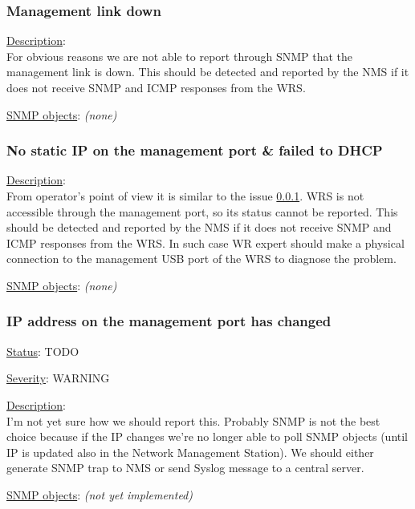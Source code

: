 \subsubsection{\bf Management link down}
		\label{fail:other:management_link}
		\begin{packed_enum}
			\item [] \underline{Description}:\\
				For obvious reasons we are not able to report through SNMP that the
				management link is down. This should be detected and reported by the NMS
				if it does not receive SNMP and ICMP responses from the WRS.
			\item [] \underline{SNMP objects}: \emph{(none)}
		\end{packed_enum}

\subsubsection{\bf No static IP on the management port \& failed to DHCP}
		\begin{packed_enum}
			\item [] \underline{Description}:\\
				From operator's point of view it is similar to the issue
				\ref{fail:other:management_link}. WRS is not accessible through the
				management port, so its status cannot be reported. This should be
				detected and reported by the NMS if it does not receive SNMP and ICMP
				responses from the WRS. In such case WR expert should make a physical
				connection to the management USB port of the WRS to diagnose the
				problem.
			\item [] \underline{SNMP objects}: \emph{(none)}
		\end{packed_enum}

\subsubsection{\bf IP address on the management port has changed}
		\begin{packed_enum}
			\item [] \underline{Status}: TODO
			\item [] \underline{Severity}: WARNING
			\item [] \underline{Description}:\\
				I'm not yet sure how we should report this. Probably SNMP is not the
				best choice because if the IP changes we're no longer able to poll SNMP
				objects (until IP is updated also in the Network Management Station). We
				should either generate SNMP trap to NMS or send Syslog message to a
				central server.
			\item [] \underline{SNMP objects}: \emph{(not yet implemented)}
		\end{packed_enum}

